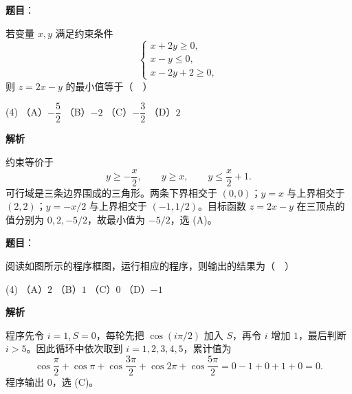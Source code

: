 \begin{answer}

\textbf{题目}：

若变量 $x,y$ 满足约束条件
\nopagebreak[4]
\[
\begin{cases}
x+2y\geqslant0,\\
x-y\leqslant0,\\
x-2y+2\geqslant0,
\end{cases}
\]
则 $z=2x-y$ 的最小值等于（　）

\begin{gkopts}(4)
\task （A）$-\dfrac52$
\task （B）$-2$
\task （C）$-\dfrac32$
\task （D）$2$
\end{gkopts}

\textbf{解析}

约束等价于
\nopagebreak[4]
\[
y\geqslant-\frac{x}{2},\qquad y\geqslant x,\qquad y\leqslant\frac{x}{2}+1.
\]
可行域是三条边界围成的三角形。两条下界相交于 $(0,0)$；$y=x$ 与上界相交于 $(2,2)$；$y=-x/2$ 与上界相交于 $(-1,1/2)$。目标函数 $z=2x-y$ 在三顶点的值分别为 $0,2,-5/2$，故最小值为 $-5/2$，选 (A)。


\end{answer}
\begin{answer}

\textbf{题目}：

阅读如图所示的程序框图，运行相应的程序，则输出的结果为（　）

\begin{gkopts}(4)
\task （A）$2$
\task （B）$1$
\task （C）$0$
\task （D）$-1$
\end{gkopts}
\nopagebreak[4]
\begin{center}\end{center}
\nopagebreak[4]
\textbf{解析}

程序先令 $i=1,S=0$，每轮先把 $\cos(i\pi/2)$ 加入 $S$，再令 $i$ 增加 $1$，最后判断 $i>5$。因此循环中依次取到 $i=1,2,3,4,5$，累计值为
\nopagebreak[4]
\[
\cos\frac{\pi}{2}+\cos\pi+\cos\frac{3\pi}{2}+\cos2\pi+\cos\frac{5\pi}{2}
=0-1+0+1+0=0.
\]
程序输出 $0$，选 (C)。


\end{answer}
